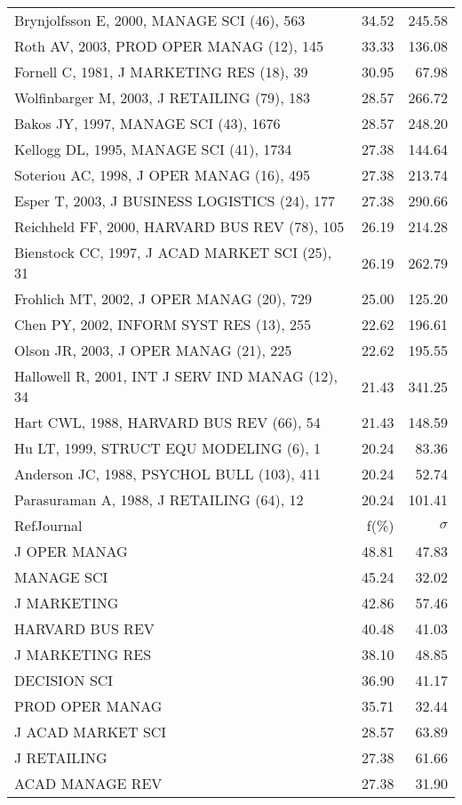 \documentclass[a4paper,11pt]{report}
\begin{document}
\begin{landscape}
\begin{table}[!ht]
{\begin{tabular}{|l r r|}
Brynjolfsson E, 2000, MANAGE SCI (46), 563 & 34.52 & 245.58\\
Roth AV, 2003, PROD OPER MANAG (12), 145 & 33.33 & 136.08\\
Fornell C, 1981, J MARKETING RES (18), 39 & 30.95 & 67.98\\
Wolfinbarger M, 2003, J RETAILING (79), 183 & 28.57 & 266.72\\
Bakos JY, 1997, MANAGE SCI (43), 1676 & 28.57 & 248.20\\
Kellogg DL, 1995, MANAGE SCI (41), 1734 & 27.38 & 144.64\\
Soteriou AC, 1998, J OPER MANAG (16), 495 & 27.38 & 213.74\\
Esper T, 2003, J BUSINESS LOGISTICS (24), 177 & 27.38 & 290.66\\
Reichheld FF, 2000, HARVARD BUS REV (78), 105 & 26.19 & 214.28\\
Bienstock CC, 1997, J ACAD MARKET SCI (25), 31 & 26.19 & 262.79\\
Frohlich MT, 2002, J OPER MANAG (20), 729 & 25.00 & 125.20\\
Chen PY, 2002, INFORM SYST RES (13), 255 & 22.62 & 196.61\\
Olson JR, 2003, J OPER MANAG (21), 225 & 22.62 & 195.55\\
Hallowell R, 2001, INT J SERV IND MANAG (12), 34 & 21.43 & 341.25\\
Hart CWL, 1988, HARVARD BUS REV (66), 54 & 21.43 & 148.59\\
Hu LT, 1999, STRUCT EQU MODELING (6), 1 & 20.24 & 83.36\\
Anderson JC, 1988, PSYCHOL BULL (103), 411 & 20.24 & 52.74\\
Parasuraman A, 1988, J RETAILING (64), 12 & 20.24 & 101.41\\
\hline
\hline
RefJournal & f(\%) & $\sigma$\\
\hline
J OPER MANAG & 48.81 & 47.83\\
MANAGE SCI & 45.24 & 32.02\\
J MARKETING & 42.86 & 57.46\\
HARVARD BUS REV & 40.48 & 41.03\\
J MARKETING RES & 38.10 & 48.85\\
DECISION SCI & 36.90 & 41.17\\
PROD OPER MANAG & 35.71 & 32.44\\
J ACAD MARKET SCI & 28.57 & 63.89\\
J RETAILING & 27.38 & 61.66\\
ACAD MANAGE REV & 27.38 & 31.90\\
\hline
\end{tabular}
}
\end{table}


\end{landscape}
\end{document}
